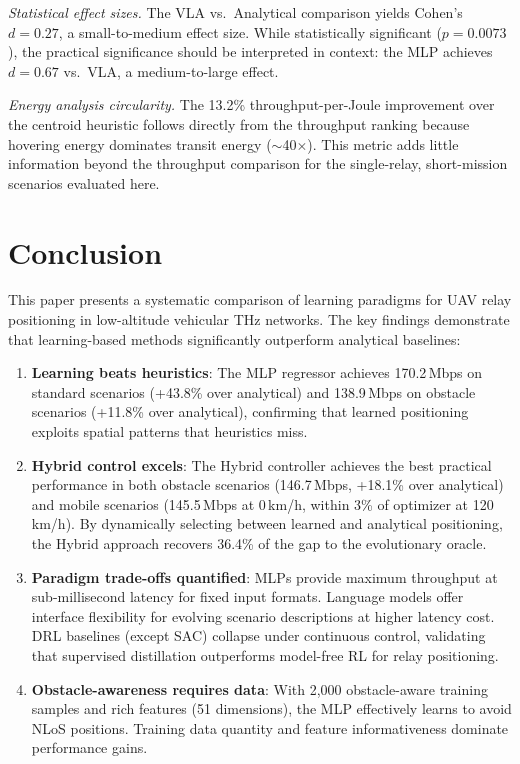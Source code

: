 \documentclass[journal]{IEEEtran}
\begin{document}
\emph{Statistical effect sizes.} The VLA vs.\ Analytical comparison yields Cohen's $d = 0.27$, a small-to-medium effect size. While statistically significant ($p = 0.0073$), the practical significance should be interpreted in context: the MLP achieves $d = 0.67$ vs.\ VLA, a medium-to-large effect.

\emph{Energy analysis circularity.} The 13.2\% throughput-per-Joule improvement over the centroid heuristic follows directly from the throughput ranking because hovering energy dominates transit energy (${\sim}$40$\times$). This metric adds little information beyond the throughput comparison for the single-relay, short-mission scenarios evaluated here.


\section{Conclusion}
\label{sec:conclusion}

This paper presents a systematic comparison of learning paradigms for UAV relay positioning in low-altitude vehicular THz networks. The key findings demonstrate that learning-based methods significantly outperform analytical baselines:

\begin{enumerate}
    \item \textbf{Learning beats heuristics}: The MLP regressor achieves 170.2\,Mbps on standard scenarios (+43.8\% over analytical) and 138.9\,Mbps on obstacle scenarios (+11.8\% over analytical), confirming that learned positioning exploits spatial patterns that heuristics miss.

    \item \textbf{Hybrid control excels}: The Hybrid controller achieves the best practical performance in both obstacle scenarios (146.7\,Mbps, +18.1\% over analytical) and mobile scenarios (145.5\,Mbps at 0\,km/h, within 3\% of optimizer at 120\,km/h). By dynamically selecting between learned and analytical positioning, the Hybrid approach recovers 36.4\% of the gap to the evolutionary oracle.

    \item \textbf{Paradigm trade-offs quantified}: MLPs provide maximum throughput at sub-millisecond latency for fixed input formats. Language models offer interface flexibility for evolving scenario descriptions at higher latency cost. DRL baselines (except SAC) collapse under continuous control, validating that supervised distillation outperforms model-free RL for relay positioning.

    \item \textbf{Obstacle-awareness requires data}: With 2{,}000 obstacle-aware training samples and rich features (51 dimensions), the MLP effectively learns to avoid NLoS positions. Training data quantity and feature informativeness dominate performance gains.
\end{enumerate}
\end{document}
